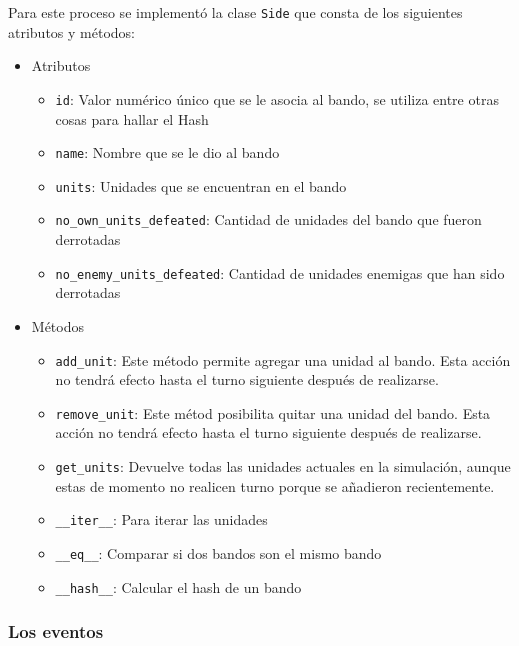 Para este proceso se implement\'o la clase \verb|Side| que consta de los siguientes atributos y m\'etodos:
\begin{itemize}
\item Atributos
\begin{itemize}
\item \verb|id|: Valor num\'erico \'unico que se le asocia al bando, se utiliza entre otras cosas para hallar el Hash

\item \verb|name|: Nombre que se le dio al bando

\item \verb|units|: Unidades que se encuentran en el bando

\item \verb|no_own_units_defeated|: Cantidad de unidades del bando que fueron derrotadas

\item \verb|no_enemy_units_defeated|: Cantidad de unidades enemigas que han sido derrotadas

\end{itemize}

\item M\'etodos 
\begin{itemize}
\item \verb|add_unit|: Este m\'etodo permite agregar una unidad al bando. Esta acci\'on no tendr\'a efecto hasta el turno siguiente despu\'es de realizarse.

\item \verb|remove_unit|: Este m\'etod posibilita quitar una unidad del bando. Esta acci\'on no tendr\'a efecto hasta el turno siguiente despu\'es de realizarse.

\item \verb|get_units|: Devuelve todas las unidades actuales en la simulaci\'on, aunque estas de momento no realicen turno porque se añadieron recientemente.

\item \verb|__iter__|: Para iterar las unidades

\item \verb|__eq__|: Comparar si dos bandos son el mismo bando

\item \verb|__hash__|: Calcular el hash de un bando
\end{itemize}
\end{itemize}

\subsubsection{Los eventos}

